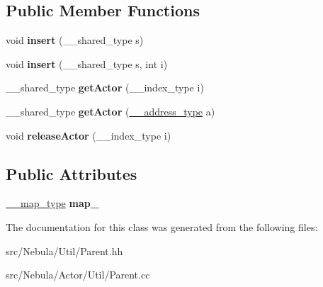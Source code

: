 \subsection*{Public Member Functions}
\begin{DoxyCompactItemize}
\item 
\hypertarget{classNeb_1_1Util_1_1Parent_ab9cecc39fdd77920d7d5471d1a467d93}{void {\bfseries insert} (\-\_\-\-\_\-shared\-\_\-type s)}\label{classNeb_1_1Util_1_1Parent_ab9cecc39fdd77920d7d5471d1a467d93}

\item 
\hypertarget{classNeb_1_1Util_1_1Parent_a89f075013f69d738aacb053ad03f6d74}{void {\bfseries insert} (\-\_\-\-\_\-shared\-\_\-type s, int i)}\label{classNeb_1_1Util_1_1Parent_a89f075013f69d738aacb053ad03f6d74}

\item 
\hypertarget{classNeb_1_1Util_1_1Parent_a63f60dc032bb83f169a1787fcf475584}{\-\_\-\-\_\-shared\-\_\-type {\bfseries get\-Actor} (\-\_\-\-\_\-index\-\_\-type i)}\label{classNeb_1_1Util_1_1Parent_a63f60dc032bb83f169a1787fcf475584}

\item 
\hypertarget{classNeb_1_1Util_1_1Parent_aa4f705f655566c0464812b187802293d}{\-\_\-\-\_\-shared\-\_\-type {\bfseries get\-Actor} (\hyperlink{classNeb_1_1Util_1_1Address}{\-\_\-\-\_\-address\-\_\-type} a)}\label{classNeb_1_1Util_1_1Parent_aa4f705f655566c0464812b187802293d}

\item 
\hypertarget{classNeb_1_1Util_1_1Parent_a11643ffe2a73c430efcb3d8f5d94ec1b}{void {\bfseries release\-Actor} (\-\_\-\-\_\-index\-\_\-type i)}\label{classNeb_1_1Util_1_1Parent_a11643ffe2a73c430efcb3d8f5d94ec1b}

\end{DoxyCompactItemize}
\subsection*{Public Attributes}
\begin{DoxyCompactItemize}
\item 
\hypertarget{classNeb_1_1Util_1_1Parent_a3453bb8be352ee7f50288b10aeccac26}{\hyperlink{classNeb_1_1Map}{\-\_\-\-\_\-map\-\_\-type} {\bfseries map\-\_\-}}\label{classNeb_1_1Util_1_1Parent_a3453bb8be352ee7f50288b10aeccac26}

\end{DoxyCompactItemize}


The documentation for this class was generated from the following files\-:\begin{DoxyCompactItemize}
\item 
src/\-Nebula/\-Util/Parent.\-hh\item 
src/\-Nebula/\-Actor/\-Util/Parent.\-cc\end{DoxyCompactItemize}
